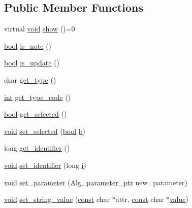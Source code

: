 \subsection*{Public Member Functions}
\begin{DoxyCompactItemize}
\item 
virtual \hyperlink{sound_8c_ae35f5844602719cf66324f4de2a658b3}{void} \hyperlink{class_alg__event_ae9e15a8a630eff7364af6d5c43750f13}{show} ()=0
\item 
\hyperlink{mac_2config_2i386_2lib-src_2libsoxr_2soxr-config_8h_abb452686968e48b67397da5f97445f5b}{bool} \hyperlink{class_alg__event_a64b1f5d9b8c35b02024558330e057c0c}{is\+\_\+note} ()
\item 
\hyperlink{mac_2config_2i386_2lib-src_2libsoxr_2soxr-config_8h_abb452686968e48b67397da5f97445f5b}{bool} \hyperlink{class_alg__event_a29cb9d5aee3c56e1726ee2875cd17e39}{is\+\_\+update} ()
\item 
char \hyperlink{class_alg__event_aeca15fdac0b9107c8784b32eb97c33bf}{get\+\_\+type} ()
\item 
\hyperlink{xmltok_8h_a5a0d4a5641ce434f1d23533f2b2e6653}{int} \hyperlink{class_alg__event_a0eb99d2f2f3c4a9f14032048bd9994d1}{get\+\_\+type\+\_\+code} ()
\item 
\hyperlink{mac_2config_2i386_2lib-src_2libsoxr_2soxr-config_8h_abb452686968e48b67397da5f97445f5b}{bool} \hyperlink{class_alg__event_a325ce852cb2288e667bd10b8dda622a8}{get\+\_\+selected} ()
\item 
\hyperlink{sound_8c_ae35f5844602719cf66324f4de2a658b3}{void} \hyperlink{class_alg__event_ae07443cee73a58bfc7083f48dc0ea537}{set\+\_\+selected} (\hyperlink{mac_2config_2i386_2lib-src_2libsoxr_2soxr-config_8h_abb452686968e48b67397da5f97445f5b}{bool} \hyperlink{convtest_8m_a21ad0bd836b90d08f4cf640b4c298e7c}{b})
\item 
long \hyperlink{class_alg__event_a63d0c75e88e076602983188043b0da5e}{get\+\_\+identifier} ()
\item 
\hyperlink{sound_8c_ae35f5844602719cf66324f4de2a658b3}{void} \hyperlink{class_alg__event_a6dad7f2f6e88e0c3241c4d5b1c381415}{set\+\_\+identifier} (long \hyperlink{checksum_8c_ab80e330a3bc9e38c1297fe17381e92b4}{i})
\item 
\hyperlink{sound_8c_ae35f5844602719cf66324f4de2a658b3}{void} \hyperlink{class_alg__event_addec2ce2e5d61d44ea1236d06b3831a9}{set\+\_\+parameter} (\hyperlink{allegro_8h_a11b6679f8e1fe576476b10e4bc1f7240}{Alg\+\_\+parameter\+\_\+ptr} new\+\_\+parameter)
\item 
\hyperlink{sound_8c_ae35f5844602719cf66324f4de2a658b3}{void} \hyperlink{class_alg__event_a95f1a6e7749d4c699bf09a9411260940}{set\+\_\+string\+\_\+value} (\hyperlink{getopt1_8c_a2c212835823e3c54a8ab6d95c652660e}{const} char $\ast$attr, \hyperlink{getopt1_8c_a2c212835823e3c54a8ab6d95c652660e}{const} char $\ast$\hyperlink{lib_2expat_8h_a4a30a13b813682e68c5b689b45c65971}{value})

\end{DoxyCompactItemize}
